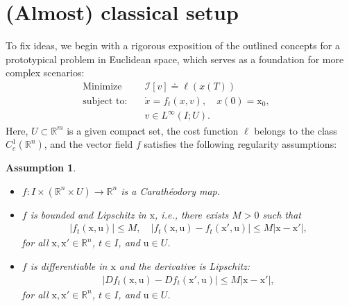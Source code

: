 \documentclass[sn-mathphys-num]{sn-jnl}
\numberwithin{equation}{section}
\theoremstyle{mythm}
\theoremstyle{mydef}
\newtheorem{assumption}{Assumption}\renewcommand{\theassumption}{(A\arabic{assumption})}  %
\begin{document}

\section{(Almost) classical setup}%
\label{sec:odes}

To fix ideas, we begin with a rigorous exposition of the outlined concepts for a prototypical problem in Euclidean space, which serves as a foundation for more complex scenarios: 
\begin{align}
 \text{Minimize} \quad & \mathcal I[v] \doteq \ell\left(x(T)\right) &\nonumber\\
\text{subject to:} \quad & \dot x = f_t(x, v), \quad x(0) = \mathrm{x}_0 ,\tag{$P$}\\
& v \in L^\infty(I;U).\nonumber
\end{align}
Here, \( U \subset \mathbb{R}^m \) is a given compact set, the cost function $\ell$ belongs to the class \( C^1_c(\mathbb{R}^n) \), and the vector field $f$ satisfies the following regularity assumptions:
\begin{tcolorbox}
\begin{assumption}
\label{a0}
~
\begin{itemize}
  \item \( f\colon I \times (\mathbb{R}^n \times U)\to \mathbb{R}^n \) is a Carath\'{e}odory map. 
	
  \item \( f \) is bounded and Lipschitz in \( \mathrm x \), i.e., there exists \( M > 0 \) such that
	    \begin{gather*}
        \left|f_t(\mathrm x,\mathrm u)\right|\le M,\quad
	\left|f_{t}(\mathrm x,\mathrm u)-f_{t}(\mathrm x',\mathrm u)\right|\le M|\mathrm x-\mathrm x'|,
	  \end{gather*}
		for all \(\mathrm x,\mathrm x'\in \mathbb{R}^n \), \(t\in  I \), and \(\mathrm u \in U\).
  
  \item \( f \) is differentiable in \( \mathrm x \) and the derivative is Lipschitz:
  \begin{gather*}
    \left|Df_t(\mathrm x,\mathrm u) - Df_t(\mathrm x',\mathrm u)\right|\le M|\mathrm x-\mathrm x'|,
  \end{gather*}
  for all \(\mathrm x,\mathrm x'\in \mathbb{R}^n \), \(t\in  I \), and \(\mathrm u \in U\).
\end{itemize}
\end{assumption}
\end{tcolorbox}
\end{document}
